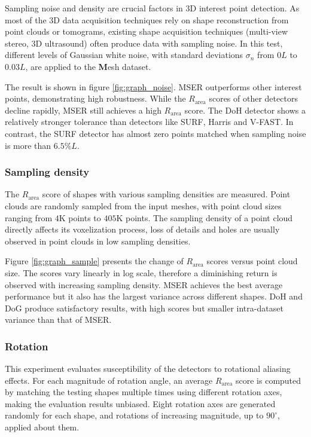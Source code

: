 Sampling noise and density are crucial factors in 3D interest point detection. As most of the 3D data acquisition techniques rely on shape reconstruction from point clouds or tomograms, existing shape acquisition techniques (\eg multi-view stereo, 3D ultrasound) often produce data with sampling noise. 
In this test, different levels of Gaussian white noise, with standard deviations $\sigma_{n}$ from $0L$ to $0.03L$, are applied to the {\textbf Mesh} dataset.

The result is shown in figure \ref{fig:graph_noise}. MSER outperforms other interest points, demonstrating high robustness. While the $R_{\textrm{area}}$ scores of other detectors decline rapidly,
MSER still achieves a high $R_{\textrm{area}}$ score. The DoH detector shows a relatively stronger tolerance than detectors like SURF, Harris and V-FAST. In contrast, the SURF detector has almost zero points matched when sampling noise is more than $6.5\%L$.

\subsubsection{Sampling density}

The $R_{\textrm{area}}$ score of shapes with various sampling densities are measured. Point clouds are randomly sampled from the input meshes, with point cloud sizes ranging from $4$K points to $405$K points. The sampling density of a point cloud directly affects its voxelization process, loss of details and holes are usually observed in point clouds in low sampling densities. 

Figure \ref{fig:graph_sample} presents the change of $R_{\textrm{area}}$ scores versus point cloud size. The scores vary linearly in log scale, therefore a diminishing return is observed with increasing sampling density. MSER achieves the best average performance but it also has the largest variance across different shapes. DoH and DoG produce satisfactory results, with high scores but smaller intra-dataset variance than that of MSER.

\subsubsection{Rotation}

This experiment evaluates susceptibility of the detectors to rotational aliasing effects. 
For each magnitude of rotation angle, an average $R_{\textrm{area}}$ score is computed by matching the testing shapes multiple times using different rotation axes, making the evaluation results unbiased. Eight rotation axes are generated randomly for each shape, and rotations of increasing magnitude, up to $90^\circ$, applied about them. 

